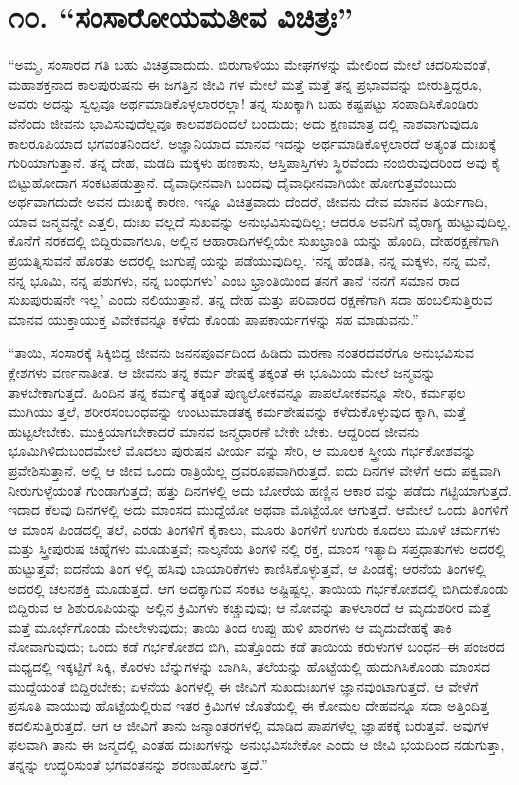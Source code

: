
\chapter{೧೦. “ಸಂಸಾರೋಯಮತೀವ ವಿಚಿತ್ರಃ”}

“ಅಮ್ಮ, ಸಂಸಾರದ ಗತಿ ಬಹು ವಿಚಿತ್ರವಾದುದು. ಬಿರುಗಾಳಿಯು ಮೇಘಗಳನ್ನು ಮೇಲಿಂದ ಮೇಲೆ ಚದರಿಸುವಂತೆ, ಮಹಾಶಕ್ತನಾದ ಕಾಲಪುರುಷನು ಈ ಜಗತ್ತಿನ ಜೀವಿ ಗಳ ಮೇಲೆ ಮತ್ತೆ ಮತ್ತೆ ತನ್ನ ಪ್ರಭಾವವನ್ನು ಬೀರುತ್ತಿದ್ದರೂ, ಅವರು ಅದನ್ನು ಸ್ವಲ್ಪವೂ ಅರ್ಥಮಾಡಿಕೊಳ್ಳಲಾರರಲ್ಲಾ! ತನ್ನ ಸುಖಕ್ಕಾಗಿ ಬಹು ಕಷ್ಟಪಟ್ಟು ಸಂಪಾದಿಸಿಕೊಂಡಿರು ವೆನೆಂದು ಜೀವನು ಭಾವಿಸುವುದೆಲ್ಲವೂ ಕಾಲವಶದಿಂದಲೆ ಬಂದುದು; ಅದು ಕ್ಷಣಮಾತ್ರ ದಲ್ಲಿ ನಾಶವಾಗುವುದೂ ಕಾಲರೂಪಿಯಾದ ಭಗವಂತನಿಂದಲೆ. ಅಜ್ಞಾನಿಯಾದ ಮಾನವ ಇದನ್ನು ಅರ್ಥಮಾಡಿಕೊಳ್ಳಲಾರದೆ ಅತ್ಯಂತ ದುಃಖಕ್ಕೆ ಗುರಿಯಾಗುತ್ತಾನೆ. ತನ್ನ ದೇಹ, ಮಡದಿ ಮಕ್ಕಳು ಹಣಕಾಸು, ಆಸ್ತಿಪಾಸ್ತಿಗಳು ಸ್ಥಿರವೆಂದು ನಂಬಿರುವುದರಿಂದ ಅವು ಕೈ ಬಿಟ್ಟುಹೋದಾಗ ಸಂಕಟಪಡುತ್ತಾನೆ. ದೈವಾಧೀನವಾಗಿ ಬಂದವು ದೈವಾಧೀನವಾಗಿಯೇ ಹೋಗುತ್ತವೆಂಬುದು ಅರ್ಥವಾಗದುದೇ ಅವನ ದುಃಖಕ್ಕೆ ಕಾರಣ. ಇನ್ನೂ ವಿಚಿತ್ರವಾದು ದೆಂದರೆ, ಜೀವನು ದೇವ ಮಾನವ ತಿರ್ಯಗಾದಿ, ಯಾವ ಜನ್ಮವನ್ನೇ ಎತ್ತಲಿ, ದುಃಖ ವಲ್ಲದೆ ಸುಖವನ್ನು ಅನುಭವಿಸುವುದಿಲ್ಲ; ಆದರೂ ಅವನಿಗೆ ವೈರಾಗ್ಯ ಹುಟ್ಟುವುದಿಲ್ಲ. ಕೊನೆಗೆ ನರಕದಲ್ಲಿ ಬಿದ್ದಿರುವಾಗಲೂ, ಅಲ್ಲಿನ ಆಹಾರಾದಿಗಳಲ್ಲಿಯೇ ಸುಖಭ್ರಾಂತಿ ಯನ್ನು ಹೊಂದಿ, ದೇಹರಕ್ಷಣೆಗಾಗಿ ಪ್ರಯತ್ನಿಸುವನೆ ಹೊರತು ಅದರಲ್ಲಿ ಜುಗುಪ್ಸೆ ಯನ್ನು ಪಡೆಯುವುದಿಲ್ಲ. ‘ನನ್ನ ಹೆಂಡತಿ, ನನ್ನ ಮಕ್ಕಳು, ನನ್ನ ಮನೆ, ನನ್ನ ಭೂಮಿ, ನನ್ನ ಪಶುಗಳು, ನನ್ನ ಬಂಧುಗಳು’ ಎಂಬ ಭ್ರಾಂತಿಯಿಂದ ತನಗೆ ತಾನೆ ‘ನನಗೆ ಸಮಾನ ರಾದ ಸುಖಪುರುಷನೇ ಇಲ್ಲ’ ಎಂದು ನಲಿಯುತ್ತಾನೆ. ತನ್ನ ದೇಹ ಮತ್ತು ಪರಿವಾರದ ರಕ್ಷಣೆಗಾಗಿ ಸದಾ ಹಂಬಲಿಸುತ್ತಿರುವ ಮಾನವ ಯುಕ್ತಾಯುಕ್ತ ವಿವೇಕವನ್ನೂ ಕಳೆದು ಕೊಂಡು ಪಾಪಕಾರ್ಯಗಳನ್ನು ಸಹ ಮಾಡುವನು.”

“ತಾಯಿ, ಸಂಸಾರಕ್ಕೆ ಸಿಕ್ಕಿಬಿದ್ದ ಜೀವನು ಜನನಪೂರ್ವದಿಂದ ಹಿಡಿದು ಮರಣಾ ನಂತರದವರೆಗೂ ಅನುಭವಿಸುವ ಕ್ಲೇಶಗಳು ವರ್ಣನಾತೀತ. ಆ ಜೀವನು ತನ್ನ ಕರ್ಮ ಶೇಷಕ್ಕೆ ತಕ್ಕಂತೆ ಈ ಭೂಮಿಯ ಮೇಲೆ ಜನ್ಮವನ್ನು ತಾಳಬೇಕಾಗುತ್ತದೆ. ಹಿಂದಿನ ತನ್ನ ಕರ್ಮಕ್ಕೆ ತಕ್ಕಂತೆ ಪುಣ್ಯಲೋಕವನ್ನೂ ಪಾಪಲೋಕವನ್ನೂ ಸೇರಿ, ಕರ್ಮಫಲ ಮುಗಿಯು ತ್ತಲೆ, ಶರೀರಸಂಬಂಧವನ್ನು ಉಂಟುಮಾಡತಕ್ಕ ಕರ್ಮಶೇಷವನ್ನು ಕಳೆದುಕೊಳ್ಳುವುದ ಕ್ಕಾಗಿ, ಮತ್ತೆ ಹುಟ್ಟಲೇಬೇಕು. ಮುಕ್ತಿಯಾಗಬೇಕಾದರೆ ಮಾನವ ಜನ್ಮಧಾರಣೆ ಬೇಕೇ ಬೇಕು. ಆದ್ದರಿಂದ ಜೀವನು ಭೂಮಿಗಿಳಿದುಬಂದಮೇಲೆ ಮೊದಲು ಪುರುಷನ ವೀರ್ಯ ವನ್ನು ಸೇರಿ, ಆ ಮೂಲಕ ಸ್ತ್ರೀಯ ಗರ್ಭಕೋಶವನ್ನು ಪ್ರವೇಶಿಸುತ್ತಾನೆ. ಅಲ್ಲಿ ಆ ಜೀವ ಒಂದು ರಾತ್ರಿಯೆಲ್ಲ ದ್ರವರೂಪವಾಗಿರುತ್ತದೆ. ಐದು ದಿನಗಳ ವೇಳೆಗೆ ಅದು ಪಕ್ವವಾಗಿ ನೀರುಗುಳ್ಳೆಯಂತೆ ಗುಂಡಾಗುತ್ತದೆ; ಹತ್ತು ದಿನಗಳಲ್ಲಿ ಅದು ಬೋರೆಯ ಹಣ್ಣಿನ ಆಕಾರ ವನ್ನು ಪಡೆದು ಗಟ್ಟಿಯಾಗುತ್ತದೆ. ಇದಾದ ಕೆಲವು ದಿನಗಳಲ್ಲಿ ಅದು ಮಾಂಸದ ಮುದ್ದೆಯೋ ಅಥವಾ ಮೊಟ್ಟೆಯೋ ಆಗುತ್ತದೆ. ಆಮೇಲೆ ಒಂದು ತಿಂಗಳಿಗೆ ಆ ಮಾಂಸ ಪಿಂಡದಲ್ಲಿ ತಲೆ, ಎರಡು ತಿಂಗಳಿಗೆ ಕೈಕಾಲು, ಮೂರು ತಿಂಗಳಿಗೆ ಉಗುರು ಕೂದಲು ಮೂಳೆ ಚರ್ಮಗಳು ಮತ್ತು ಸ್ತ್ರೀಪುರುಷ ಚಿಹ್ನೆಗಳು ಮೂಡುತ್ತವೆ; ನಾಲ್ಕನೆಯ ತಿಂಗಳಿ ನಲ್ಲಿ ರಕ್ತ, ಮಾಂಸ ಇತ್ಯಾದಿ ಸಪ್ತಧಾತುಗಳು ಅದರಲ್ಲಿ ಹುಟ್ಟುತ್ತವೆ; ಐದನೆಯ ತಿಂಗ ಳಲ್ಲಿ ಹಸಿವು ಬಾಯಾರಿಕೆಗಳು ಕಾಣಿಸಿಕೊಳ್ಳುತ್ತವೆ, ಆ ಪಿಂಡಕ್ಕೆ; ಆರನೆಯ ತಿಂಗಳಲ್ಲಿ ಅದರಲ್ಲಿ ಚಲನಶಕ್ತಿ ಮೂಡುತ್ತದೆ. ಆಗ ಅದಕ್ಕಾಗುವ ಸಂಕಟ ಅಷ್ಟಿಷ್ಟಲ್ಲ. ತಾಯಿಯ ಗರ್ಭಕೋಶದಲ್ಲಿ ಬಿಗಿದುಕೊಂಡು ಬಿದ್ದಿರುವ ಆ ಶಿಶುರೂಪಿಯನ್ನು ಅಲ್ಲಿನ ಕ್ರಿಮಿಗಳು ಕಚ್ಚುವುವು; ಆ ನೋವನ್ನು ತಾಳಲಾರದೆ ಆ ಮೃದುಶರೀರ ಮತ್ತೆ ಮತ್ತೆ ಮೂರ್ಛೆಗೊಂಡು ಮೇಲೇಳುವುದು; ತಾಯಿ ತಿಂದ ಉಪ್ಪು ಹುಳಿ ಖಾರಗಳು ಆ ಮೃದುದೇಹಕ್ಕೆ ತಾಕಿ ನೋವಾಗುವುದು; ಒಂದು ಕಡೆ ಗರ್ಭಕೋಶದ ಬಿಗಿ, ಮತ್ತೊಂದು ಕಡೆ ತಾಯಿಯ ಕರುಳುಗಳ ಬಂಧನ–ಈ ಪಂಜರದ ಮಧ್ಯದಲ್ಲಿ ಇಕ್ಕಟ್ಟಿಗೆ ಸಿಕ್ಕಿ, ಕೊರಳು ಬೆನ್ನುಗಳನ್ನು ಬಾಗಿಸಿ, ತಲೆಯನ್ನು ಹೊಟ್ಟೆಯಲ್ಲಿ ಹುದುಗಿಸಿಕೊಂಡು ಮಾಂಸದ ಮುದ್ದೆಯಂತೆ ಬಿದ್ದಿರಬೇಕು; ಏಳನೆಯ ತಿಂಗಳಲ್ಲಿ ಈ ಜೀವಿಗೆ ಸುಖದುಃಖಗಳ ಜ್ಞಾನವುಂಟಾಗುತ್ತದೆ. ಆ ವೇಳೆಗೆ ಪ್ರಸೂತಿ ವಾಯುವು ಹೊಟ್ಟೆಯಲ್ಲಿರುವ ಇತರ ಕ್ರಿಮಿಗಳ ಜೊತೆಯಲ್ಲಿ ಈ ಕೋಮಲ ದೇಹವನ್ನೂ ಸದಾ ಅತ್ತಿಂದಿತ್ತ ಕದಲಿಸುತ್ತಿರುತ್ತದೆ. ಆಗ ಆ ಜೀವಿಗೆ ತಾನು ಜನ್ಮಾಂತರಗಳಲ್ಲಿ ಮಾಡಿದ ಪಾಪಗಳೆಲ್ಲ ಜ್ಞಾಪಕಕ್ಕೆ ಬರುತ್ತವೆ. ಅವುಗಳ ಫಲವಾಗಿ ತಾನು ಈ ಜನ್ಮದಲ್ಲಿ ಎಂತಹ ದುಃಖಗಳನ್ನು ಅನುಭವಿಸಬೇಕೋ ಎಂದು ಆ ಜೀವಿ ಭಯದಿಂದ ನಡುಗುತ್ತಾ, ತನ್ನನ್ನು ಉದ್ಧರಿಸುಂತೆ ಭಗವಂತನನ್ನು ಶರಣುಹೋಗು ತ್ತದೆ.”

